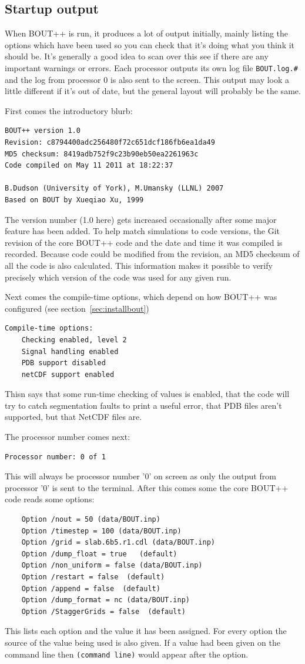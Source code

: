 \documentclass[12pt]{article}
\begin{document}
\subsection{Startup output}

When BOUT++ is run, it produces a lot of output initially, mainly listing
the options which have been used so you can check that it's doing what you
think it should be. It's generally a good idea to scan over this
see if there are any important warnings or errors. Each processor outputs
its own log file \texttt{BOUT.log.\#}
and the log from processor 0 is also sent to the screen. This output may
look a little different if it's out of date, but the general layout will
probably be the same.

First comes the introductory blurb:
\begin{verbatim}
BOUT++ version 1.0
Revision: c8794400adc256480f72c651dcf186fb6ea1da49
MD5 checksum: 8419adb752f9c23b90eb50ea2261963c
Code compiled on May 11 2011 at 18:22:37

B.Dudson (University of York), M.Umansky (LLNL) 2007
Based on BOUT by Xueqiao Xu, 1999
\end{verbatim}
The version number (1.0 here) gets increased occasionally after
some major feature has been added. To help match simulations to code versions,
the Git revision of the core BOUT++ code and the date and time it was
compiled is recorded. Because code could be modified from the revision,
an MD5 checksum of all the code is also calculated. This information
makes it possible to verify precisely which version of the code was used
for any given run.

Next comes the compile-time options, which depend on how
BOUT++ was configured (see section~\ref{sec:installbout})
\begin{verbatim}
Compile-time options:
	Checking enabled, level 2
	Signal handling enabled
	PDB support disabled
	netCDF support enabled
\end{verbatim}
Thisn says that some run-time checking of values is enabled,
that the code will try to catch segmentation faults to print a useful
error, that PDB files aren't supported, but that NetCDF files are.

The processor number comes next:
\begin{verbatim}
Processor number: 0 of 1
\end{verbatim}
This will always be processor number '0' on screen as only the output
from processor '0' is sent to the terminal. After this comes some
the core BOUT++ code reads some options:
\begin{verbatim}
	Option /nout = 50 (data/BOUT.inp)
	Option /timestep = 100 (data/BOUT.inp)
	Option /grid = slab.6b5.r1.cdl (data/BOUT.inp)
	Option /dump_float = true   (default)
	Option /non_uniform = false (data/BOUT.inp)
	Option /restart = false  (default)
	Option /append = false  (default)
	Option /dump_format = nc (data/BOUT.inp)
	Option /StaggerGrids = false  (default)
\end{verbatim}
This lists each option and the value it has been assigned.
For every option the source of the value being used is also given.
If a value had been given on the command line then \texttt{(command line)}
would appear after the option.
\end{document}
